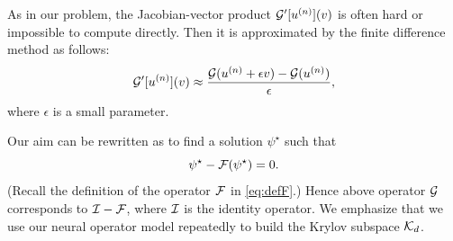 \begin{appendix}
  As in our problem, the Jacobian-vector product $\cal{G}'[u^{(n)}](v)$ 
  is often hard or impossible to compute directly.
  Then it is approximated by the finite difference method as follows:
  \[ \cal{G}'[u^{(n)}](v) \approx 
  \frac{\cal{G}(u^{(n)} + \epsilon v) - \cal{G}(u^{(n)})}{\epsilon}, \]
  where $\epsilon$ is a small parameter.

  Our aim can be rewritten as to find a solution $\psi^\star$ such that 
  \[ \psi^\star - \cal{F}(\psi^\star) = 0. \]
  (Recall the definition of the operator $\cal{F}$ in \eqref{eq:defF}.)
  Hence above operator $\cal{G}$ corresponds to $\cal{I} - \cal{F}$, 
  where $\cal{I}$ is the identity operator.
  We emphasize that we use our neural operator model repeatedly
  to build the Krylov subspace $\cal{K}_d$.

\end{appendix}

%
%






